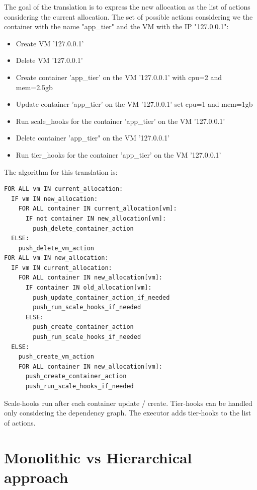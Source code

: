The goal of the translation is to express the new allocation as the list of actions considering the current allocation. The set of possible actions considering we the container with the name "app\_tier" and the VM with the IP "127.0.0.1":
\begin{itemize}
    \item Create VM '127.0.0.1'
    \item Delete VM '127.0.0.1'
    \item Create container 'app\_tier' on the VM '127.0.0.1' with cpu=2 and mem=2.5gb
    \item \begin{sloppypar}Update container 'app\_tier' on the VM '127.0.0.1' set cpu=1 and mem=1gb\end{sloppypar}
    \item Run scale\_hooks for the container 'app\_tier' on the VM '127.0.0.1'
    \item Delete container 'app\_tier" on the VM '127.0.0.1'
    \item Run tier\_hooks for the container 'app\_tier' on the VM '127.0.0.1'
\end{itemize}

The algorithm for this translation is:
\begin{lstlisting}[caption=Translation algorithm]
FOR ALL vm IN current_allocation:
  IF vm IN new_allocation:
    FOR ALL container IN current_allocation[vm]:
      IF not container IN new_allocation[vm]:
        push_delete_container_action
  ELSE:
    push_delete_vm_action
FOR ALL vm IN new_allocation:
  IF vm IN current_allocation:
    FOR ALL container IN new_allocation[vm]:
      IF container IN old_allocation[vm]:
        push_update_container_action_if_needed
        push_run_scale_hooks_if_needed
      ELSE:
        push_create_container_action
        push_run_scale_hooks_if_needed
  ELSE:
    push_create_vm_action
    FOR ALL container IN new_allocation[vm]:
      push_create_container_action
      push_run_scale_hooks_if_needed
\end{lstlisting}

Scale-hooks run after each container update / create. Tier-hooks can be handled only considering the dependency graph. The executor adds tier-hooks to the list of actions.

\section{Monolithic vs Hierarchical approach}

